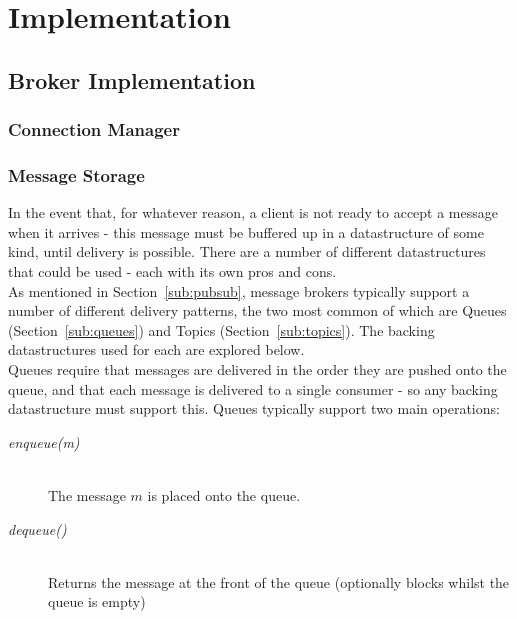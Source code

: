 \chapter{Implementation}
\label{chap:Implementation}

\section{Broker Implementation}
\label{sec:Broker Implementation}


\subsection{Connection Manager}
\label{sub:Connection Manager}


\subsection{Message Storage}
\label{sub:messageStorage}

In the event that, for whatever reason, a client is not ready to accept a
message when it arrives - this message must be buffered up in a datastructure of
some kind, until delivery is possible. There are a number of different
datastructures that could be used - each with its own pros and cons. \\

As mentioned in Section~\ref{sub:pubsub}, message brokers typically support a
number of different delivery patterns, the two most common of which are Queues
(Section~\ref{sub:queues}) and Topics (Section~\ref{sub:topics}). The backing
datastructures used for each are explored below. \\

Queues require that messages are delivered in the order they are pushed onto the
queue, and that each message is delivered to a single consumer - so any backing
datastructure must support this. Queues typically support two main operations:

\begin{description}
  \item[\textit{enqueue(m)}] \hfill \\
    The message $m$ is placed onto the queue.
  \item[\textit{dequeue()}] \hfill \\
    Returns the message at the front of the queue (optionally blocks whilst the queue is empty)
\end{description}

